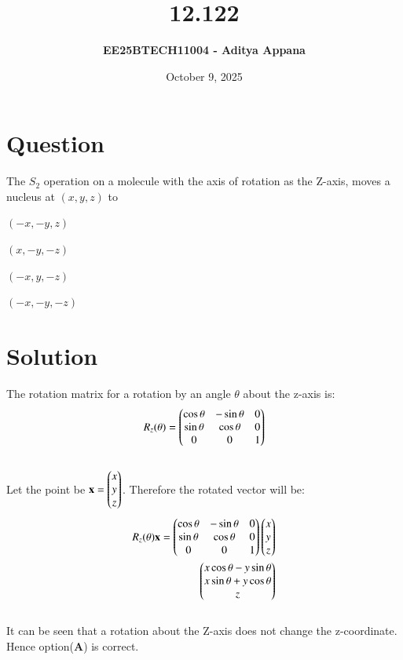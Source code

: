 \documentclass[12pt]{article}
\title{\textbf{12.122}}
\author{\textbf{EE25BTECH11004 - Aditya Appana}}
\date{October 9, 2025}
\begin{document}
\maketitle

\section*{Question}
The $S_2$ operation on a molecule with the axis of rotation as the Z-axis, moves a nucleus at $(x,y,z)$ to
\begin{enumerate}
\begin{multicols}{4}
    \item $(-x,-y,z)$
    \item $(x,-y,-z)$
    \item $(-x,y,-z)$
    \item $(-x,-y,-z)$
\end{multicols}
\end{enumerate}
\section*{Solution}

The rotation matrix for a rotation by an angle $\theta$ about the z-axis is:
\begin{align}
R_z(\theta) = \begin{pmatrix}
\cos\theta & -\sin\theta & 0 \\
\sin\theta & \cos\theta & 0 \\
0 & 0 & 1\end{pmatrix}
\end{align}\\
Let the point be $\mathbf{x} = \begin{pmatrix}x\\y\\z\end{pmatrix}$. Therefore the rotated vector will be:
\begin{align}
 R_z(\theta)\mathbf{x} =
 \begin{pmatrix}\cos\theta & -\sin\theta & 0 \\\sin\theta & \cos\theta & 0 \\0 & 0 & 1\end{pmatrix}\begin{pmatrix}x\\y\\z\end{pmatrix}\\
 \begin{pmatrix}x\cos\theta - y\sin\theta \\ x\sin\theta +y\cos\theta \\ z\end{pmatrix}
\end{align}\\
It can be seen that a rotation about the Z-axis does not change the z-coordinate. Hence option(\textbf{A}) is correct.
\end{document}
